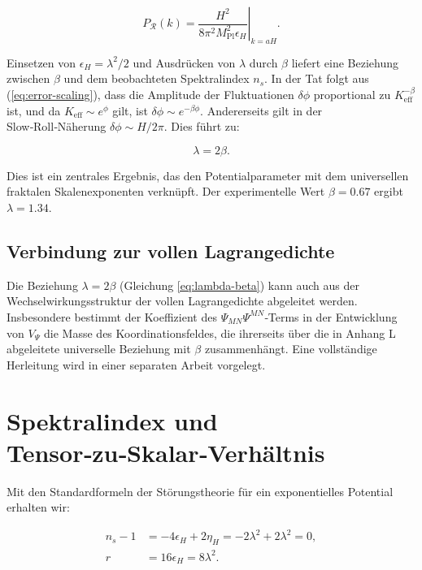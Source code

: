 \documentclass[11pt,a4paper]{article}
\newcommand{\Keff}{K_{\mathrm{eff}}}
\newcommand{\Mpl}{M_{\mathrm{Pl}}}
\newcommand{\rs}{r}
\begin{document}
	\begin{equation}
		P_{\mathcal{R}}(k) = \left. \frac{H^2}{8\pi^2 \Mpl^2 \epsilon_H} \right|_{k=aH}.
	\end{equation}
	
	Einsetzen von \(\epsilon_H = \lambda^2/2\) und Ausdrücken von \(\lambda\) durch \(\beta\) liefert eine Beziehung zwischen \(\beta\) und dem beobachteten Spektralindex \(n_s\). In der Tat folgt aus (\ref{eq:error-scaling}), dass die Amplitude der Fluktuationen \(\delta \phi\) proportional zu \(\Keff^{-\beta}\) ist, und da \(\Keff \sim e^{\phi}\) gilt, ist \(\delta \phi \sim e^{-\beta \phi}\). Andererseits gilt in der Slow‑Roll‑Näherung \(\delta \phi \sim H/2\pi\). Dies führt zu:
	
	\begin{equation}
		\lambda = 2\beta.
		\label{eq:lambda-beta}
	\end{equation}
	
	Dies ist ein zentrales Ergebnis, das den Potentialparameter mit dem universellen fraktalen Skalenexponenten verknüpft. Der experimentelle Wert \(\beta = 0.67\) ergibt \(\lambda = 1.34\).
	
	\subsection{Verbindung zur vollen Lagrangedichte}
	
	Die Beziehung \(\lambda = 2\beta\) (Gleichung \ref{eq:lambda-beta}) kann auch aus der Wechselwirkungsstruktur der vollen Lagrangedichte abgeleitet werden. Insbesondere bestimmt der Koeffizient des \(\Psi_{MN}\Psi^{MN}\)‑Terms in der Entwicklung von \(V_{\Psi}\) die Masse des Koordinationsfeldes, die ihrerseits über die in Anhang L abgeleitete universelle Beziehung mit \(\beta\) zusammenhängt. Eine vollständige Herleitung wird in einer separaten Arbeit vorgelegt.
	
	\section{Spektralindex und Tensor‑zu‑Skalar‑Verhältnis}
	\label{sec:predictions}
	
	Mit den Standardformeln der Störungstheorie für ein exponentielles Potential erhalten wir:
	
	\begin{align}
		n_s - 1 &= -4\epsilon_H + 2\eta_H = -2\lambda^2 + 2\lambda^2 = 0, \label{eq:ns-temp}\\
		\rs &= 16\epsilon_H = 8\lambda^2. \label{eq:r-pred}
	\end{align}
	
\end{document}
